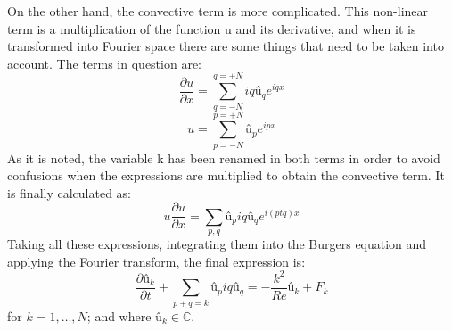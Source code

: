 On the other hand, the convective term is more complicated. This non-linear term is a multiplication of the function u and its derivative, and when it is transformed into Fourier space there are some things that need to be taken into account. The terms in question are:
\begin{equation}
\frac{\partial u}{\partial x}=\sum_{q=-N}^{q=+N}iqû_{q}e^{iqx}
\end{equation}
\begin{equation}
u=\sum_{p=-N}^{p=+N}û_{p}e^{ipx}
\end{equation}
As it is noted, the variable k has been renamed in both terms in order to avoid confusions when the expressions are multiplied to obtain the convective term. It is finally calculated as:
\begin{equation}
u\frac{\partial u}{\partial x}=\sum_{p,q}û_{p}iqû_{q}e^{i\left(ptq\right)x}
\end{equation}
Taking all these expressions, integrating them into the Burgers equation and applying the Fourier transform, the final expression is:
\begin{equation}
\frac{\partial û_{k}}{\partial t}+\sum_{p+q=k}û_{p}iqû_{q}=-\frac{k^{2}}{Re}û_{k}+F_{k}
\end{equation}
for $k=1,\dots, N$; and where $û_{k}\in\mathbb{C}$.

